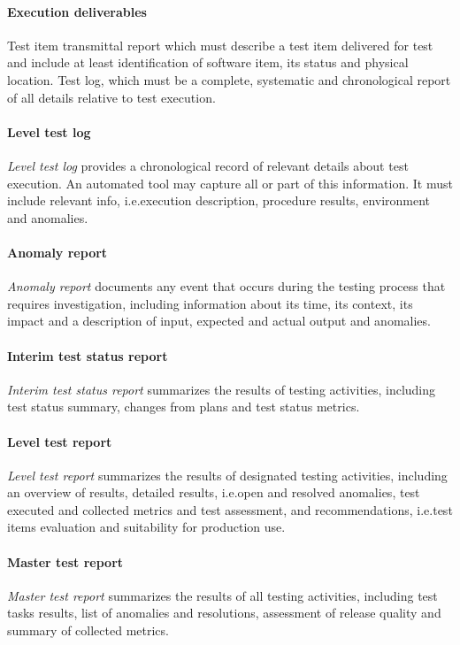 \paragraph{Execution deliverables}
Test item transmittal report which must describe a test item delivered for test and include at least identification of software item, its status and physical location. Test log, which must be a complete, systematic and chronological report of all details relative to test execution.

\paragraph{Level test log}
\emph{Level test log} provides a chronological record of relevant details about test execution. An automated tool may capture all or part of this information. It must include relevant info, i.e.\@ execution description, procedure results, environment and anomalies.

\paragraph{Anomaly report}
\emph{Anomaly report} documents any event that occurs during the testing process that requires investigation, including information about its time, its context, its impact and a description of input, expected and actual output and anomalies.

\paragraph{Interim test status report}
\emph{Interim test status report} summarizes the results of testing activities, including test status summary, changes from plans and test status metrics.

\paragraph{Level test report}
\emph{Level test report} summarizes the results of designated testing activities, including an overview of results, detailed results, i.e.\@ open and resolved anomalies, test executed and collected metrics and test assessment, and recommendations, i.e.\@ test items evaluation and suitability for production use.

\paragraph{Master test report}
\emph{Master test report} summarizes the results of all testing activities, including test tasks results, list of anomalies and resolutions, assessment of release quality and summary of collected metrics.

